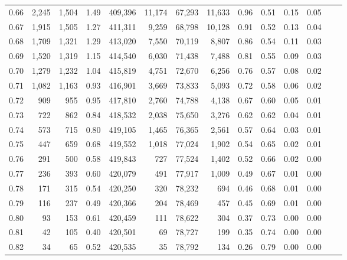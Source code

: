 \begin{tabular}{rrrrrrrrrrrrrr}
0.66 &   2,245 &  1,504 &    1.49 &  409,396 &   11,174 &  67,293 &  11,633 &  0.96 &  0.51 &  0.15 &      0.05 \\
0.67 &   1,915 &  1,505 &    1.27 &  411,311 &    9,259 &  68,798 &  10,128 &  0.91 &  0.52 &  0.13 &      0.04 \\
0.68 &   1,709 &  1,321 &    1.29 &  413,020 &    7,550 &  70,119 &   8,807 &  0.86 &  0.54 &  0.11 &      0.03 \\
0.69 &   1,520 &  1,319 &    1.15 &  414,540 &    6,030 &  71,438 &   7,488 &  0.81 &  0.55 &  0.09 &      0.03 \\
0.70 &   1,279 &  1,232 &    1.04 &  415,819 &    4,751 &  72,670 &   6,256 &  0.76 &  0.57 &  0.08 &      0.02 \\
0.71 &   1,082 &  1,163 &    0.93 &  416,901 &    3,669 &  73,833 &   5,093 &  0.72 &  0.58 &  0.06 &      0.02 \\
0.72 &     909 &    955 &    0.95 &  417,810 &    2,760 &  74,788 &   4,138 &  0.67 &  0.60 &  0.05 &      0.01 \\
0.73 &     722 &    862 &    0.84 &  418,532 &    2,038 &  75,650 &   3,276 &  0.62 &  0.62 &  0.04 &      0.01 \\
0.74 &     573 &    715 &    0.80 &  419,105 &    1,465 &  76,365 &   2,561 &  0.57 &  0.64 &  0.03 &      0.01 \\
0.75 &     447 &    659 &    0.68 &  419,552 &    1,018 &  77,024 &   1,902 &  0.54 &  0.65 &  0.02 &      0.01 \\
0.76 &     291 &    500 &    0.58 &  419,843 &      727 &  77,524 &   1,402 &  0.52 &  0.66 &  0.02 &      0.00 \\
0.77 &     236 &    393 &    0.60 &  420,079 &      491 &  77,917 &   1,009 &  0.49 &  0.67 &  0.01 &      0.00 \\
0.78 &     171 &    315 &    0.54 &  420,250 &      320 &  78,232 &     694 &  0.46 &  0.68 &  0.01 &      0.00 \\
0.79 &     116 &    237 &    0.49 &  420,366 &      204 &  78,469 &     457 &  0.45 &  0.69 &  0.01 &      0.00 \\
0.80 &      93 &    153 &    0.61 &  420,459 &      111 &  78,622 &     304 &  0.37 &  0.73 &  0.00 &      0.00 \\
0.81 &      42 &    105 &    0.40 &  420,501 &       69 &  78,727 &     199 &  0.35 &  0.74 &  0.00 &      0.00 \\
0.82 &      34 &     65 &    0.52 &  420,535 &       35 &  78,792 &     134 &  0.26 &  0.79 &  0.00 &      0.00 \\

\end{tabular}
